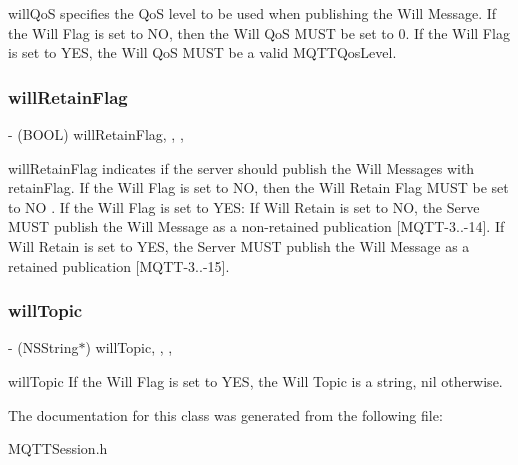will\+QoS specifies the QoS level to be used when publishing the Will Message. If the Will Flag is set to NO, then the Will QoS M\+U\+ST be set to 0. If the Will Flag is set to Y\+ES, the Will QoS M\+U\+ST be a valid M\+Q\+T\+T\+Qos\+Level. \mbox{\label{interface_m_q_t_t_session_a54df13cee1ccaa0bf803304c33a3b237}} 
\subsubsection{\texorpdfstring{will\+Retain\+Flag}{willRetainFlag}}
{\footnotesize\ttfamily -\/ (B\+O\+OL) will\+Retain\+Flag\hspace{0.3cm}{\ttfamily [read]}, {\ttfamily [write]}, {\ttfamily [nonatomic]}, {\ttfamily [assign]}}

will\+Retain\+Flag indicates if the server should publish the Will Messages with retain\+Flag. If the Will Flag is set to NO, then the Will Retain Flag M\+U\+ST be set to NO . If the Will Flag is set to Y\+ES\+: If Will Retain is set to NO, the Serve M\+U\+ST publish the Will Message as a non-\/retained publication \mbox{[}M\+Q\+T\+T-\/3..-\/14\mbox{]}. If Will Retain is set to Y\+ES, the Server M\+U\+ST publish the Will Message as a retained publication \mbox{[}M\+Q\+T\+T-\/3..-\/15\mbox{]}. \mbox{\label{interface_m_q_t_t_session_a20fd768170dd1d21800420f376d04042}} 
\subsubsection{\texorpdfstring{will\+Topic}{willTopic}}
{\footnotesize\ttfamily -\/ (N\+S\+String$\ast$) will\+Topic\hspace{0.3cm}{\ttfamily [read]}, {\ttfamily [write]}, {\ttfamily [nonatomic]}, {\ttfamily [strong]}}

will\+Topic If the Will Flag is set to Y\+ES, the Will Topic is a string, nil otherwise. 

The documentation for this class was generated from the following file\+:\begin{DoxyCompactItemize}
\item 
M\+Q\+T\+T\+Session.\+h\end{DoxyCompactItemize}
